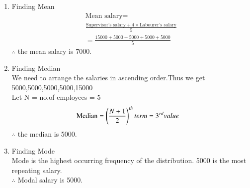 
	\begin{enumerate}
	\item Finding Mean \\
	\begin{multline}
	\text{Mean salary} = \\\frac{\text{Supervisor's salary} + 4\times \text{Labourer's salary}}{5}
\\
= \frac{15000+5000+5000+5000+5000}{5}
	\end{multline}
	$\therefore$ the mean salary is 7000.
	
	\item Finding Median \\
	We need to arrange the salaries in ascending order.Thus we get 5000,5000,5000,5000,15000\\
	Let N = no.of employees = 5\\
	\begin{align}
	\text{Median} &= \left(\frac{N+1}{2}\right)^{th} term = 3^{rd}value
	\end{align}
	$\therefore$ the median is 5000.
	
	\item Finding Mode\\
	Mode is the highest occurring frequency of the distribution. 5000 is the most repeating salary.\\
	$\therefore$ Modal salary is 5000.
\end{enumerate}
